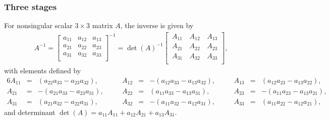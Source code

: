 \documentclass[a4paper,10pt]{article}
\begin{document}
\subsubsection{Three stages}

For nonsingular scalar $3\times 3$ matrix $A$, the inverse is given by 
%
\begin{align}
{A}^{-1} =
\begin{bmatrix}
	a_{11} & a_{12} & a_{13}\\ a_{21} & a_{22} & a_{23} \\ a_{31} & a_{32} & a_{33}\\
\end{bmatrix}^{-1} =
\det({A})^{-1} \begin{bmatrix}
	\, A_{11} & \, A_{12} & \,A_{13} \\ \, A_{21} & \, A_{22} & \,A_{23} \\ \, A_{31} & \,A_{32} & \, A_{33}\\
\end{bmatrix},\label{eq:3inv}
\end{align}
%
with elements defined by
%
\begin{alignat*}{6}
A_{11} &={}&  (a_{22}a_{33} - a_{23}a_{32}), &\quad&
    A_{12} &={}& -(a_{12}a_{33} - a_{13}a_{32}), &\quad&
    A_{13} &={}&  (a_{12}a_{23} - a_{13}a_{22}), \\
A_{21} &={}& -(a_{21}a_{33} - a_{23}a_{31}), &\quad&
    A_{22} &={}&  (a_{11}a_{33} - a_{13}a_{31}), &\quad&
    A_{23} &={}& -(a_{11}a_{23} - a_{13}a_{21}), \\
A_{31} &={}&  (a_{21}a_{32} - a_{22}a_{31}), &\quad&
    A_{32} &={}& -(a_{11}a_{32} - a_{12}a_{31}), &\quad&
    A_{33} &={}&  (a_{11}a_{22} - a_{12}a_{21}),
\end{alignat*}
%
and determinant $\det({A}) = a_{11}A_{11}+a_{12}A_{21}+a_{13}A_{31}$.
\end{document}
